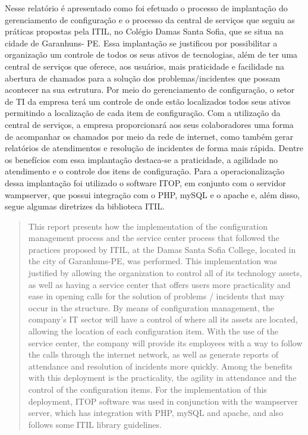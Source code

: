\documentclass[eso]{bcc}
\begin{document}

\capa


\begin{resumo}
Nesse relatório é apresentado como foi efetuado o processo de implantação do gerenciamento de configuração e o processo da central de serviços que seguiu as práticas propostas pela ITIL, no Colégio Damas Santa Sofia, que se situa na cidade de Garanhuns- PE. Essa implantação se justificou por possibilitar a organização um controle de todos os seus ativos de tecnologias, além de ter uma central de serviços que oferece, aos usuários, mais praticidade e facilidade na abertura de chamados para a solução dos problemas/incidentes que possam acontecer na sua estrutura. 
Por meio do gerenciamento de configuração, o setor de TI da empresa terá um controle de onde estão localizados todos seus ativos  permitindo a localização  de cada item de configuração. Com a utilização da central de serviços, a empresa proporcionará aos seus colaboradores uma forma de acompanhar os chamados por meio da rede de internet, como também gerar relatórios de atendimentos e resolução de incidentes de forma mais rápida. 
Dentre os benefícios com essa implantação destaca-se a praticidade, a agilidade no atendimento e o controle dos itens de configuração. Para a operacionalização dessa implantação foi utilizado o software ITOP, em conjunto com o servidor wampserver, que possui integração com o PHP, mySQL e o apache e, além disso, segue algumas diretrizes da biblioteca ITIL. 
\end{resumo}


\begin{abstract}

This report presents how the implementation of the configuration management process and the service center process that followed the practices proposed by ITIL, at the Damas Santa Sofia College, located in the city of Garanhuns-PE, was performed. This implementation was justified by allowing the organization to control all of its technology assets, as well as having a service center that offers users more practicality and ease in opening calls for the solution of problems / incidents that may occur in the structure.
By means of configuration management, the company's IT sector will have a control of where all its assets are located, allowing the location of each configuration item. With the use of the service center, the company will provide its employees with a way to follow the calls through the internet network, as well as generate reports of attendance and resolution of incidents more quickly.
Among the benefits with this deployment is the practicality, the agility in attendance and the control of the configuration items. For the implementation of this deployment, ITOP software was used in conjunction with the wampserver server, which has integration with PHP, mySQL and apache, and also follows some ITIL library guidelines.
\end{abstract}
\end{document}
